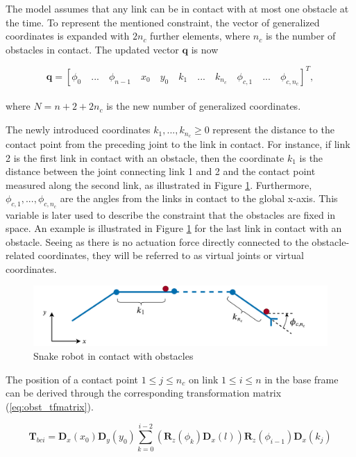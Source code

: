The model assumes that any link can be in contact with at most one obstacle at the time. To represent the mentioned constraint, the vector of generalized coordinates is expanded with $2n_c$ further elements, where $n_c$ is the number of obstacles in contact. The updated vector $\mathbf{q}$ is now

\begin{equation} \label{eq:q2}
    \mathbf{q} = 
    [
        \phi_0 \quad... \quad \phi_{n-1} \quad x_0 \quad y_0 \quad k_{1} \quad ... \quad k_{n_c} \quad \phi_{c,1} \quad ... \quad \phi_{c,n_c}
    ]^T,
\end{equation}
\\
where $N = n + 2 + 2n_c$ is the new number of generalized coordinates.

The newly introduced coordinates $k_{1}, ... , k_{n_c} \geq 0$ represent the distance to the contact point from the preceding joint to the link in contact. For instance, if link 2 is the first link in contact with an obstacle, then the coordinate $k_{1}$ is the distance between the joint connecting link 1 and 2 and the contact point measured along the second link, as illustrated in Figure \ref{fig:obst-coords}. Furthermore, $\phi_{c,1}, ... , \phi_{c,n_c}$ are the angles from the links in contact to the global x-axis. This variable is later used to describe the constraint that the obstacles are fixed in space. An example is illustrated in Figure \ref{fig:obst-coords} for the last link in contact with an obstacle.
Seeing as there is no actuation force directly connected to the obstacle-related coordinates, they will be referred to as virtual joints or virtual coordinates.

\begin{figure}
    \centering
    \includegraphics[width=\textwidth]{figures/theory/obst-coords.pdf}
    \caption{Snake robot in contact with obstacles}
    \label{fig:obst-coords}
\end{figure}

The position of a contact point $1\leq j\leq n_c$ on link $1\leq i\leq n$ in the base frame can be derived through the corresponding transformation matrix (\ref{eq:obst_tfmatrix}).

\begin{equation} \label{eq:obst_tfmatrix}
    \textbf{T}_{b ci} = \textbf{D}_x(x_0) \textbf{D}_y(y_0) \sum_{k=0}^{i-2} (\textbf{R}_z(\phi_k) \textbf{D}_x(l)) \textbf{R}_z(\phi_{i-1}) \textbf{D}_x(k_{j})
\end{equation}


